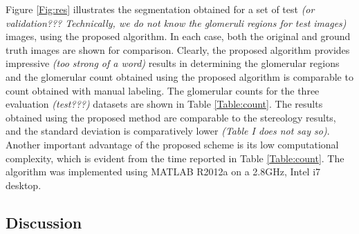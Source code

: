 Figure \ref{Fig:res} illustrates the segmentation obtained for a set of test \textit{(or validation??? Technically, we do not know the glomeruli regions for test images)} images, using the proposed algorithm. In each case, both the original and ground truth images are shown for comparison. Clearly, the proposed algorithm provides impressive \textit{(too strong of a word)} results in determining the glomerular regions and the glomerular count obtained using the proposed algorithm is comparable to count obtained with manual labeling. The glomerular counts for the three evaluation \textit{(test???)} datasets are shown in Table \ref{Table:count}. The results obtained using the proposed method are comparable to the stereology results, and the standard deviation is comparatively lower \textit{(Table I does not say so)}. Another important advantage of the proposed scheme is its low computational complexity, which is evident from the time reported in Table \ref{Table:count}. The algorithm was implemented using MATLAB R2012a on a 2.8GHz, Intel i7 desktop.

\subsection{Discussion}
